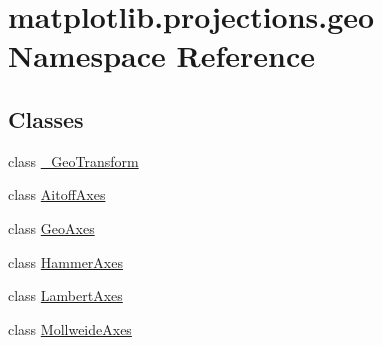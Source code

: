 \hypertarget{namespacematplotlib_1_1projections_1_1geo}{}\section{matplotlib.\+projections.\+geo Namespace Reference}
\label{namespacematplotlib_1_1projections_1_1geo}
\subsection*{Classes}
\begin{DoxyCompactItemize}
\item 
class \hyperlink{classmatplotlib_1_1projections_1_1geo_1_1__GeoTransform}{\+\_\+\+Geo\+Transform}
\item 
class \hyperlink{classmatplotlib_1_1projections_1_1geo_1_1AitoffAxes}{Aitoff\+Axes}
\item 
class \hyperlink{classmatplotlib_1_1projections_1_1geo_1_1GeoAxes}{Geo\+Axes}
\item 
class \hyperlink{classmatplotlib_1_1projections_1_1geo_1_1HammerAxes}{Hammer\+Axes}
\item 
class \hyperlink{classmatplotlib_1_1projections_1_1geo_1_1LambertAxes}{Lambert\+Axes}
\item 
class \hyperlink{classmatplotlib_1_1projections_1_1geo_1_1MollweideAxes}{Mollweide\+Axes}
\end{DoxyCompactItemize}
